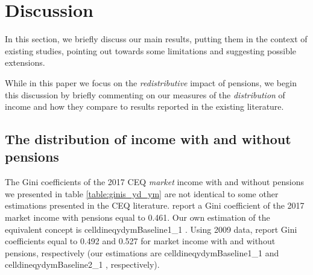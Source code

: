 \documentclass{article}
\newcommand{\celldineqydymBaseline}[2]{%
  \csname celldineqydymBaseline#1_#2\endcsname
}
\begin{document}
\section{Discussion} \label{sec:discussion}

In this section, we briefly discuss our main results, putting them in the context of existing studies, pointing out towards some limitations and suggesting possible extensions.  


While in this paper we focus on the \textit{redistributive} impact of pensions, we begin this discussion by briefly commenting on our measures of the \textit{distribution} of income and how they compare to results reported in the existing literature.

\subsection{The distribution of income with and without pensions}
 
The Gini coefficients of the 2017 CEQ \textit{market} income with and without pensions we presented in table \ref{table:ginis_yd_ym} are not identical to some other estimations presented in the CEQ literature.  \textcite{Bucheli2020} report a Gini coefficient  of the 2017 market income with pensions equal to 0.461. Our own estimation of the equivalent concept is \celldineqydymBaseline{1}{1}.  Using 2009 data, \textcite{bucheli2014} report Gini coefficients equal to 0.492 and 0.527 for market income with and without pensions, respectively (our estimations are \celldineqydymBaseline{1}{1} and \celldineqydymBaseline{2}{1}, respectively).
 
\end{document}
